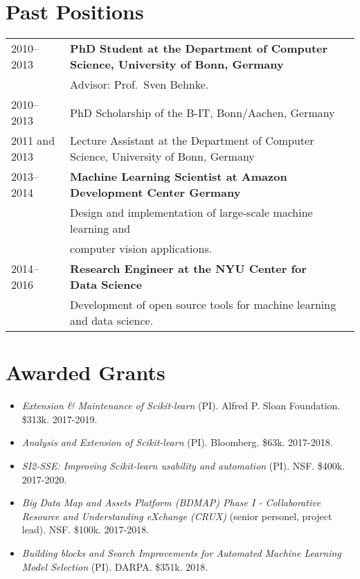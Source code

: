 \documentclass[a4paper,11pt]{article}
\begin{document}
\section{Past Positions}
\begin{tabular}{lll}
    2010--2013 & \textbf{PhD Student at the Department of Computer Science, University of Bonn, Germany}\\
         & Advisor: Prof.\ Sven Behnke. \\
    2010--2013 & PhD Scholarship of the B-IT, Bonn/Aachen, Germany\\
    2011 and 2013& Lecture Assistant at the Department of Computer Science, University of Bonn, Germany \\
    2013--2014 & \textbf{Machine Learning Scientist at Amazon Development Center Germany}\\
              & Design and implementation of large-scale machine learning and\\
              & computer vision applications.\\
    2014--2016 & \textbf{Research Engineer at the NYU Center for Data Science}\\
               & Development of open source tools for machine learning and data science.\\
\end{tabular}

\section{Awarded Grants}
\begin{itemize}
    \item \emph{Extension \& Maintenance of Scikit-learn} (PI). Alfred P. Sloan Foundation. \$313k. 2017-2019.
    \item \emph{Analysis and Extension of Scikit-learn} (PI). Bloomberg. \$63k. 2017-2018.
    \item \emph{SI2-SSE: Improving Scikit-learn usability and automation} (PI). NSF. \$400k. 2017-2020.
    \item \emph{Big Data Map and Assets Platform (BDMAP) Phase I - Collaborative Resource and Understanding eXchange (CRUX)} (senior personel, project lead). NSF. \$100k. 2017-2018.
    \item \emph{Building blocks and Search Improvements for Automated Machine Learning Model Selection} (PI). DARPA. \$351k. 2018.
\end{itemize}
\end{document}
